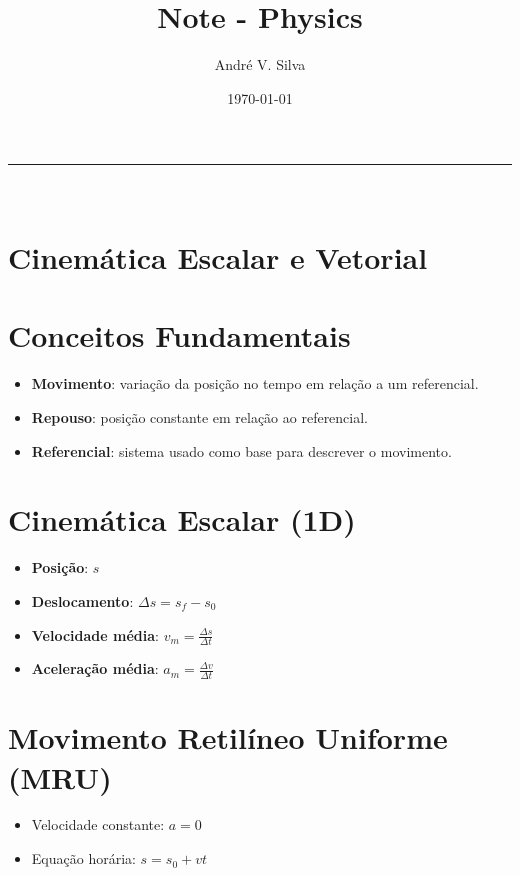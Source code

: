 \documentclass[a4paper,12pt]{article}
\title{ \textbf{\large Note - Physics}}
\author{Andr\'e V. Silva}
\date{\today}
\begin{document}
\maketitle


\noindent\rule{\linewidth}{0.4pt}\\

\justifying

\begin{multicols}{2}

\section{Cinemática Escalar e Vetorial}

\section{Conceitos Fundamentais}
\begin{itemize}
  \item \textbf{Movimento}: variação da posição no tempo em relação a um referencial.
  \item \textbf{Repouso}: posição constante em relação ao referencial.
  \item \textbf{Referencial}: sistema usado como base para descrever o movimento.
\end{itemize}

\section{Cinemática Escalar (1D)}
\begin{itemize}
  \item \textbf{Posição}: $s$
  \item \textbf{Deslocamento}: $\Delta s = s_f - s_0$
  \item \textbf{Velocidade média}: $v_m = \frac{\Delta s}{\Delta t}$
  \item \textbf{Aceleração média}: $a_m = \frac{\Delta v}{\Delta t}$
\end{itemize}

\section{Movimento Retilíneo Uniforme (MRU)}
\begin{itemize}
  \item Velocidade constante: $a = 0$
  \item Equação horária: $s = s_0 + v t$
\end{itemize}


\end{multicols}
\end{document}
